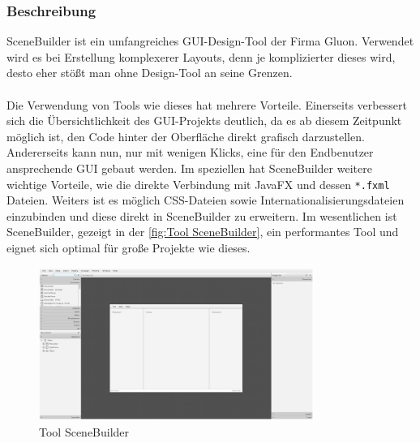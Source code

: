\subsubsection{Beschreibung}
SceneBuilder ist ein umfangreiches GUI-Design-Tool der Firma Gluon.
Verwendet wird es bei Erstellung komplexerer Layouts, denn je komplizierter dieses wird, desto eher stößt man ohne Design-Tool an seine Grenzen.\\\\
Die Verwendung von Tools wie dieses hat mehrere Vorteile.
Einerseits verbessert sich die Übersichtlichkeit des GUI-Projekts deutlich, da es ab diesem Zeitpunkt möglich ist, den Code hinter der Oberfläche direkt grafisch darzustellen.
Andererseits kann nun, nur mit wenigen Klicks, eine für den Endbenutzer ansprechende GUI gebaut werden.
Im speziellen hat SceneBuilder weitere wichtige Vorteile, wie die direkte Verbindung mit JavaFX und dessen \lstinline{*.fxml} Dateien.
Weiters ist es möglich CSS-Dateien sowie Internationalisierungsdateien einzubinden und diese direkt in SceneBuilder zu erweitern.
Im wesentlichen ist SceneBuilder, gezeigt in der \autoref{fig:Tool SceneBuilder}, ein performantes Tool und eignet sich optimal für große Projekte wie dieses.
\begin{figure}[H]
    \centering
    \includegraphics[width=0.8\textwidth]{fig/ainf/SceneBuilder.png}
    \caption{Tool SceneBuilder}
    \label{fig:Tool SceneBuilder}
\end{figure}
